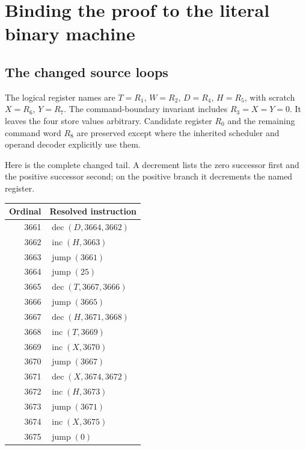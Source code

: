 \section{Binding the proof to the literal binary machine}
\label{sec:physical}

\subsection{The changed source loops}

The logical register names are $T=R_1$, $W=R_2$, $D=R_4$, $H=R_5$,
with scratch $X=R_6$, $Y=R_7$. The command-boundary invariant includes
$R_3=X=Y=0$. It leaves the four store values arbitrary. Candidate register
$R_0$ and the remaining command word $R_8$ are preserved except where
the inherited scheduler and operand decoder explicitly use them.

Here is the complete changed tail. A decrement lists the zero successor
first and the positive successor second; on the positive branch it
decrements the named register.
\begin{center}\small
\begin{tabular}{@{}rl@{}}
\toprule
Ordinal&Resolved instruction\\\midrule
3661&$\operatorname{dec}(D,3664,3662)$\\
3662&$\operatorname{inc}(H,3663)$\\
3663&$\operatorname{jump}(3661)$\\
3664&$\operatorname{jump}(25)$\\
3665&$\operatorname{dec}(T,3667,3666)$\\
3666&$\operatorname{jump}(3665)$\\
3667&$\operatorname{dec}(H,3671,3668)$\\
3668&$\operatorname{inc}(T,3669)$\\
3669&$\operatorname{inc}(X,3670)$\\
3670&$\operatorname{jump}(3667)$\\
3671&$\operatorname{dec}(X,3674,3672)$\\
3672&$\operatorname{inc}(H,3673)$\\
3673&$\operatorname{jump}(3671)$\\
3674&$\operatorname{inc}(X,3675)$\\
3675&$\operatorname{jump}(0)$\\
\bottomrule
\end{tabular}
\end{center}

